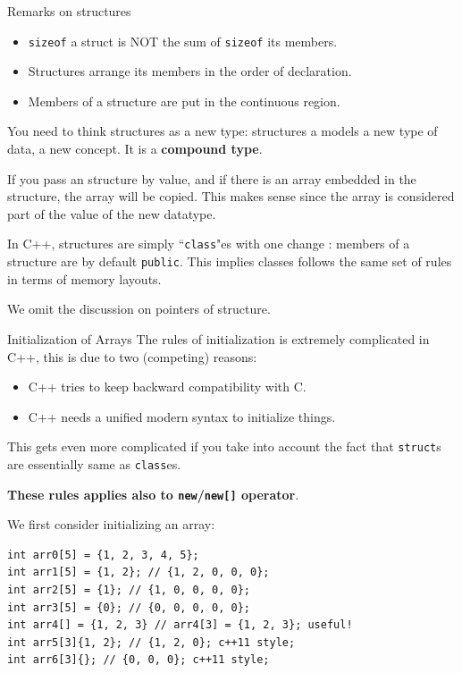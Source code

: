 \begin{frame}{Remarks on structures}
\begin{itemize}
	\item \texttt{sizeof} a struct is NOT the sum of \texttt{sizeof} its members.
	\item Structures arrange its members in the order of declaration.
	\item Members of a structure are put in the continuous region.
\end{itemize}

You need to think structures as a new type: structures a models a new type of data, a new concept. It is a \textbf{compound type}.

If you pass an structure by value, and if there is an array embedded in the structure, the array will be copied. This makes sense since the array is considered part of the value of the new datatype.

In C++, structures are simply ``\texttt{class}"es with one change : members of a structure are by default \texttt{public}. This implies classes follows the same set of rules in terms of memory layouts.

We omit the discussion on pointers of structure.
\end{frame}

\begin{frame}[fragile]{Initialization of Arrays}
The rules of initialization is extremely complicated in C++, this is due to two (competing) reasons:
\begin{itemize}
	\item C++ tries to keep backward compatibility with C. 
	\item C++ needs a unified modern syntax to initialize things.
\end{itemize}
This gets even more complicated if you take into account the fact that \texttt{struct}s are essentially same as \texttt{class}es. 

\textbf{These rules applies also to \texttt{new}/\texttt{new[]} operator}.

We first consider initializing an array:
\begin{verbatim}
int arr0[5] = {1, 2, 3, 4, 5}; 
int arr1[5] = {1, 2}; // {1, 2, 0, 0, 0};
int arr2[5] = {1}; // {1, 0, 0, 0, 0};
int arr3[5] = {0}; // {0, 0, 0, 0, 0};
int arr4[] = {1, 2, 3} // arr4[3] = {1, 2, 3}; useful!
int arr5[3]{1, 2}; // {1, 2, 0}; c++11 style;
int arr6[3]{}; // {0, 0, 0}; c++11 style;
\end{verbatim}
\end{frame}

